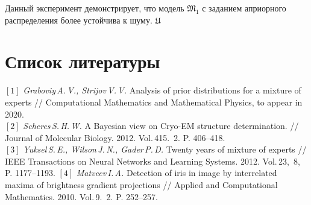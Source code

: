 \documentclass[12pt,twoside]{article}
\begin{document}
\vspace{30mm}
Данный эксперимент демонстрирует, что модель $\mathfrak{M}_1$ с заданием априорного распределения более устойчива к шуму. $\mathfrak{U}$
\newpage
\section{Список литературы}
\hspace{-6 mm}$[1]$ \textit{Graboviy\,A.\,V., Strijov\,V.\,V.} Analysis of prior distributions for a mixture of experts // Computational Mathematics and Mathematical Physics, to appear in 2020. \\
$[2]$ \textit{Scheres\,S.\,H.\,W.} A Bayesian view on Cryo-EM structure determination. // Journal of Molecular Biology. 2012. Vol.\,415. \No\,2. P. 406--418.\\
$[3]$ \textit{Yuksel\,S.\,E., Wilson\,J.\,N., Gader\,P.\,D.} Twenty years of mixture of experts // IEEE Transactions on Neural Networks and Learning Systems. 2012. Vol.\,23, \No\,8, P. 1177--1193.
$[4]$ \textit{Matveev\,I.\,A.} Detection of iris in image by interrelated maxima of brightness gradient projections //  Applied and Computational Mathematics. 2010. Vol.\,9. \No\,2. P. 252--257. \\
\end{document}
